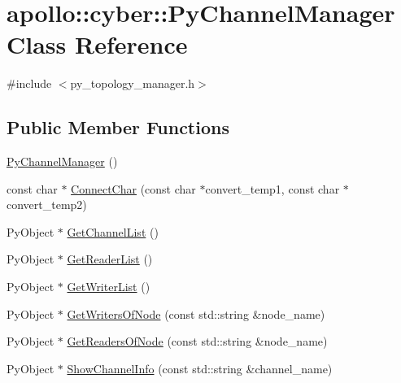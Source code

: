 \hypertarget{classapollo_1_1cyber_1_1PyChannelManager}{\section{apollo\-:\-:cyber\-:\-:Py\-Channel\-Manager Class Reference}
\label{classapollo_1_1cyber_1_1PyChannelManager}
}


{\ttfamily \#include $<$py\-\_\-topology\-\_\-manager.\-h$>$}

\subsection*{Public Member Functions}
\begin{DoxyCompactItemize}
\item 
\hyperlink{classapollo_1_1cyber_1_1PyChannelManager_ac7980eaebbdef26c98d80a8a1a27727d}{Py\-Channel\-Manager} ()
\item 
const char $\ast$ \hyperlink{classapollo_1_1cyber_1_1PyChannelManager_ad30a3ad7c39f5efdde5c437d94a231ef}{Connect\-Char} (const char $\ast$convert\-\_\-temp1, const char $\ast$convert\-\_\-temp2)
\item 
Py\-Object $\ast$ \hyperlink{classapollo_1_1cyber_1_1PyChannelManager_a201a0a0b5eb755da5f857d407d3ad115}{Get\-Channel\-List} ()
\item 
Py\-Object $\ast$ \hyperlink{classapollo_1_1cyber_1_1PyChannelManager_afb9d972800579d2293dc2d8c4f62e82c}{Get\-Reader\-List} ()
\item 
Py\-Object $\ast$ \hyperlink{classapollo_1_1cyber_1_1PyChannelManager_a8c335bdbe71473a614a21c353018bd60}{Get\-Writer\-List} ()
\item 
Py\-Object $\ast$ \hyperlink{classapollo_1_1cyber_1_1PyChannelManager_a1d475d95e87771f4cb96162f6f5016cb}{Get\-Writers\-Of\-Node} (const std\-::string \&node\-\_\-name)
\item 
Py\-Object $\ast$ \hyperlink{classapollo_1_1cyber_1_1PyChannelManager_a77578d714c1e85aff76cab9faf932b10}{Get\-Readers\-Of\-Node} (const std\-::string \&node\-\_\-name)
\item 
Py\-Object $\ast$ \hyperlink{classapollo_1_1cyber_1_1PyChannelManager_a3db60fa956d988d77fd0bc2ba7aa7a2e}{Show\-Channel\-Info} (const std\-::string \&channel\-\_\-name)
\end{DoxyCompactItemize}
